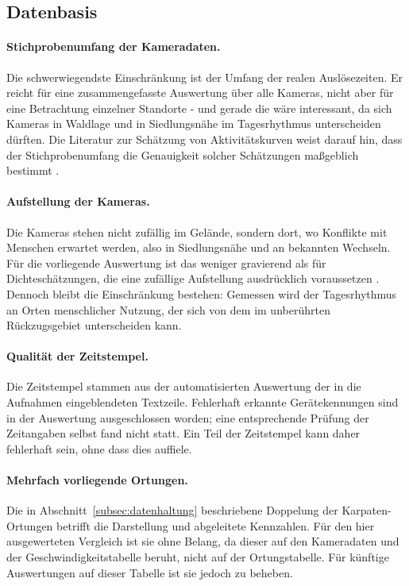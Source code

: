 \documentclass[12pt,a4paper]{report}
\begin{document}
\subsection{Datenbasis}
\label{subsec:limit-daten}

\paragraph{Stichprobenumfang der Kameradaten.} Die schwerwiegendste Einschränkung ist der
Umfang der realen Auslösezeiten. Er reicht für eine zusammengefasste Auswertung über alle
Kameras, nicht aber für eine Betrachtung einzelner Standorte - und gerade die wäre
interessant, da sich Kameras in Waldlage und in Siedlungsnähe im Tagesrhythmus unterscheiden
dürften. Die Literatur zur Schätzung von Aktivitätskurven weist darauf hin, dass der
Stichprobenumfang die Genauigkeit solcher Schätzungen maßgeblich bestimmt
\cite{Rowcliffe2014}.

\paragraph{Aufstellung der Kameras.} Die Kameras stehen nicht zufällig im Gelände, sondern
dort, wo Konflikte mit Menschen erwartet werden, also in Siedlungsnähe und an bekannten
Wechseln. Für die vorliegende Auswertung ist das weniger gravierend als für
Dichteschätzungen, die eine zufällige Aufstellung ausdrücklich voraussetzen
\cite{Rowcliffe2008}. Dennoch bleibt die Einschränkung bestehen: Gemessen wird der
Tagesrhythmus an Orten menschlicher Nutzung, der sich von dem im unberührten Rückzugsgebiet
unterscheiden kann.

\paragraph{Qualität der Zeitstempel.} Die Zeitstempel stammen aus der automatisierten
Auswertung der in die Aufnahmen eingeblendeten Textzeile. Fehlerhaft erkannte Gerätekennungen
sind in der Auswertung ausgeschlossen worden; eine entsprechende Prüfung der Zeitangaben
selbst fand nicht statt. Ein Teil der Zeitstempel kann daher fehlerhaft sein, ohne dass dies
auffiele.

\paragraph{Mehrfach vorliegende Ortungen.} Die in Abschnitt~\ref{subsec:datenhaltung}
beschriebene Doppelung der Karpaten-Ortungen betrifft die Darstellung und abgeleitete
Kennzahlen. Für den hier ausgewerteten Vergleich ist sie ohne Belang, da dieser auf den
Kameradaten und der Geschwindigkeitstabelle beruht, nicht auf der Ortungstabelle. Für
künftige Auswertungen auf dieser Tabelle ist sie jedoch zu beheben.
\end{document}
